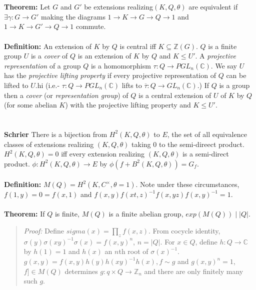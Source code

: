 \\
\\
{\bf Theorem:} Let $G$ and $G'$ be extensions realizing$(K,Q, \theta)$ are equivalent if
$\exists \gamma: G \rightarrow G'$ making the diagrams
$1 \rightarrow K \rightarrow G \rightarrow Q \rightarrow 1$ and
$1 \rightarrow K \rightarrow G' \rightarrow Q \rightarrow 1$ commute.
\\
\\
{\bf Definition:} An extension of $K$ by $Q$ is central iff $ K \subseteq {\mathbb Z}(G)$.
$Q$ is a finite group $U$ is a \emph{cover} of $Q$
is an extension of $K$ by $Q$ and $K \leq U'$.
A \emph{projective representation} of a group $Q$ is a homomorphism
$\tau: Q \rightarrow PGL_n({\mathbb C})$.
We say $U$ has the \emph{projective lifting property} if every projective representation
of $Q$ can be lifted to $U$.hi (i.e.- $\tau:Q \rightarrow PGL_n({\mathbb C})$ lifts to
${\overline {\tau}}: Q \rightarrow GL_n({\mathbb C})$.)
If $Q$ is a group then a \emph{cover} (or \emph{representation group}) of $Q$ is a
central extension of $U$ of $K$ by $Q$ (for some abelian $K$) with the projective lifting property
and $K \le U'$.
\\
\\
\\
{\bf Schrier} There is a bijection from $H^2(K, Q, \theta)$ to $E$, the set of all equivalence classes
of extensions realizing $(K,Q,\theta)$ taking $0$ to the semi-direect product.  $H^2(K, Q, \theta) = 0$
iff every extension realizing $(K, Q, \theta)$ is a semi-direct product.  $\phi: H^2(K, Q, \theta) \rightarrow E$
by $\phi(f +  B^2(K,Q, \theta)) = G_{f}$.
\\
\\
{\bf Definition:} $M(Q)= H^2(K,C^{\times}, \theta = 1)$.  Note under these circumstances,
$f(1,y)= 0 = f(x,1)$ and $f(x,y)f(xt,z)^{-1}f(x,yz) f(x,y)^{-1}=1$.
\\
\\
{\bf Theorem:} If $Q$ is finite, $M(Q)$ is a finite abelian group, $exp(M(Q)) \mid |Q|$.
\begin{quote}
\emph{Proof:}
Define $sigma(x) = \prod_z f(x,z)$.  From cocycle identity,
$\sigma(y)\sigma(xy)^{-1}\sigma(x) = f(x,y)^n$, $n = |Q|$.
For $x \in Q$, define $h:Q \rightarrow {\mathbb C}$ by $h(1)=1$ and $h(x)$ an $n$th root of $\sigma(x)^{-1}$.
$g(x,y)=f(x,y)h(y)h(xy)^{-1}h(x), f \sim g$ and $g(x,y)^n =1$, $f] \in M(Q)$ determines
$g: q \times Q \rightarrow {\mathbb Z}_n$ and there are only finitely many such $g$.
\end{quote}
